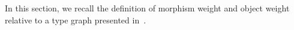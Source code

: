 In this section, we recall the definition of morphism weight and object weight relative to a type graph presented in~\cite{endrullis2024generalized_icgt}.

